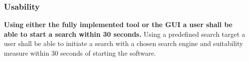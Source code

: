 \subsubsection{Usability}
\textbf{Using either the fully implemented tool or the GUI a user shall be able to start a search within 30 seconds.}
Using a predefined search target a user shall be able to initiate a search with a chosen search engine and suitability measure within 30 seconds of starting the software.